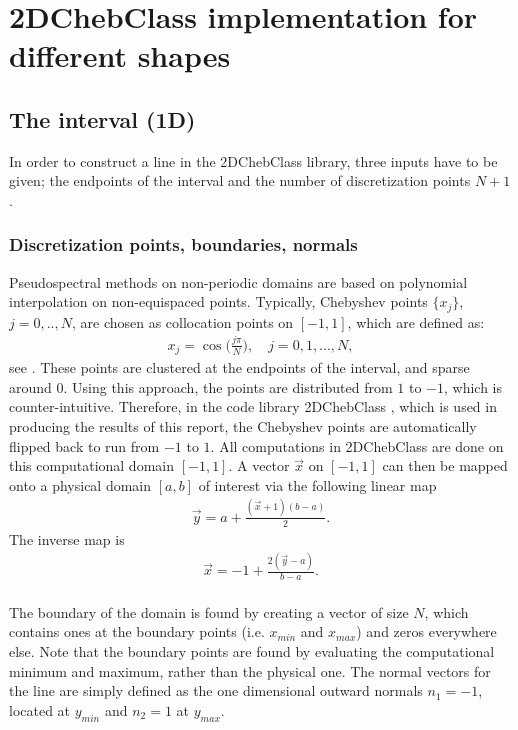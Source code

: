 \documentclass[11pt, a4paper]{article}
\theoremstyle{definition}
\begin{document}
	\tableofcontents
\section{2DChebClass implementation for different shapes}	
\subsection{The interval (1D)}
In order to construct a line in the 2DChebClass library, three inputs have to be given; the endpoints of the interval and the number of discretization points $N+1$.
\subsubsection{Discretization points, boundaries, normals}
Pseudospectral methods on non-periodic domains are based on polynomial interpolation on non-equispaced points.  
Typically, Chebyshev points $\{x_j\}$, $j = 0,..,N$, are chosen as collocation points on $[-1,1]$, which are defined as:
\begin{align}\label{defChebyshevPoints}
	x_j= \cos\bigg(\frac{j \pi}{N}\bigg), \quad j=0,1,...,N,
\end{align}	
see \cite{bibTrefethen}.
These points are clustered at the endpoints of the interval, and sparse around $0$. Using this approach, the points are distributed from $1$ to $-1$, which is counter-intuitive. Therefore, in the code library 2DChebClass \cite{GoddardPseudospectralCode1}, which is used in producing the results of this report, the Chebyshev points are automatically flipped back to run from $-1$ to $1$. All computations in 2DChebClass are done on this computational domain $[-1,1]$. A vector $\vec x$ on $[-1,1]$ can then be mapped onto a physical domain $[a,b]$ of interest via the following linear map
\begin{align}\label{eq:linearmap}
\vec y = a + \frac{(\vec x+1)(b-a)}{2}.  
\end{align}
The inverse map is 
\begin{align}\label{eq:invlinearmap}
\vec x = -1 + \frac{2(\vec y-a)}{b-a}.
\end{align}
\\
The boundary of the domain is found by creating a vector of size $N$, which contains ones at the boundary points (i.e. $x_{min}$ and $x_{max}$) and zeros everywhere else. Note that the boundary points are found by evaluating the computational minimum and maximum, rather than the physical one.
The normal vectors for the line are simply defined as the one dimensional outward normals $n_1 = -1$, located at $y_{min}$ and $n_2 = 1$ at $y_{max}$. 
\end{document}
